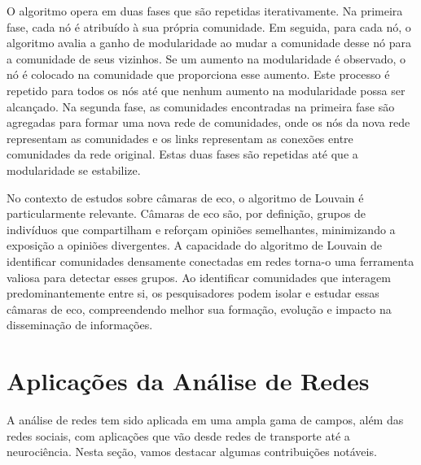 O algoritmo opera em duas fases que são repetidas iterativamente. Na primeira fase, cada nó é atribuído à sua própria comunidade. Em seguida, para cada nó, o algoritmo avalia a ganho de modularidade ao mudar a comunidade desse nó para a comunidade de seus vizinhos. Se um aumento na modularidade é observado, o nó é colocado na comunidade que proporciona esse aumento. Este processo é repetido para todos os nós até que nenhum aumento na modularidade possa ser alcançado. Na segunda fase, as comunidades encontradas na primeira fase são agregadas para formar uma nova rede de comunidades, onde os nós da nova rede representam as comunidades e os links representam as conexões entre comunidades da rede original. Estas duas fases são repetidas até que a modularidade se estabilize.

No contexto de estudos sobre câmaras de eco, o algoritmo de Louvain é particularmente relevante. Câmaras de eco são, por definição, grupos de indivíduos que compartilham e reforçam opiniões semelhantes, minimizando a exposição a opiniões divergentes. A capacidade do algoritmo de Louvain de identificar comunidades densamente conectadas em redes torna-o uma ferramenta valiosa para detectar esses grupos. Ao identificar comunidades que interagem predominantemente entre si, os pesquisadores podem isolar e estudar essas câmaras de eco, compreendendo melhor sua formação, evolução e impacto na disseminação de informações.

\section{Aplicações da Análise de Redes}

A análise de redes tem sido aplicada em uma ampla gama de campos, além das redes sociais, com aplicações que vão desde redes de transporte até a neurociência. Nesta seção, vamos destacar algumas contribuições notáveis.

